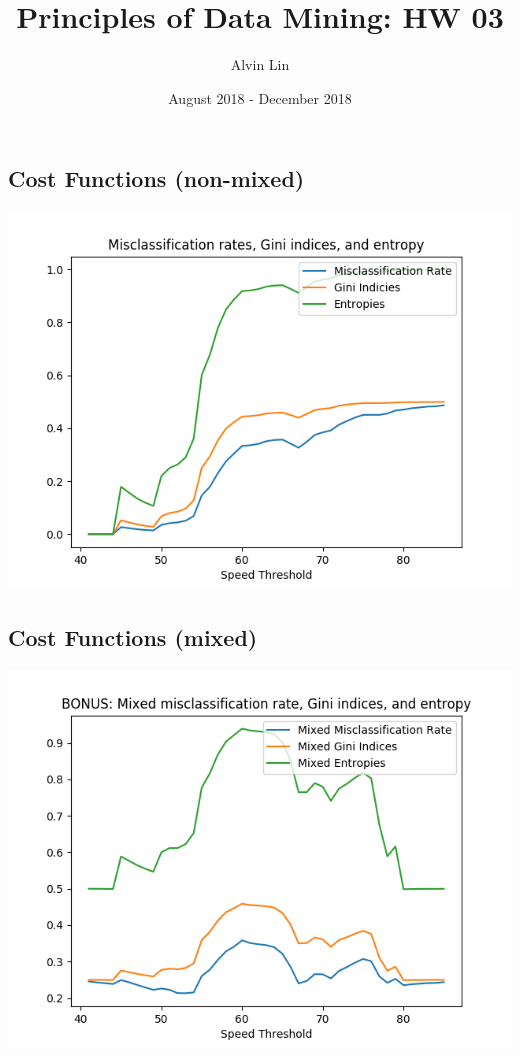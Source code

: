 \documentclass{math}
\title{Principles of Data Mining: HW 03}
\author{Alvin Lin}
\date{August 2018 - December 2018}
\begin{document}
\maketitle

\subsection*{Cost Functions (non-mixed)}
\begin{center}
  \includegraphics[width=16cm]{assets/hw_03_cost_functions.png}
\end{center}

\subsection*{Cost Functions (mixed)}
\begin{center}
  \includegraphics[width=16cm]{assets/hw_03_mixed_cost_functions.png}
\end{center}
\end{document}
